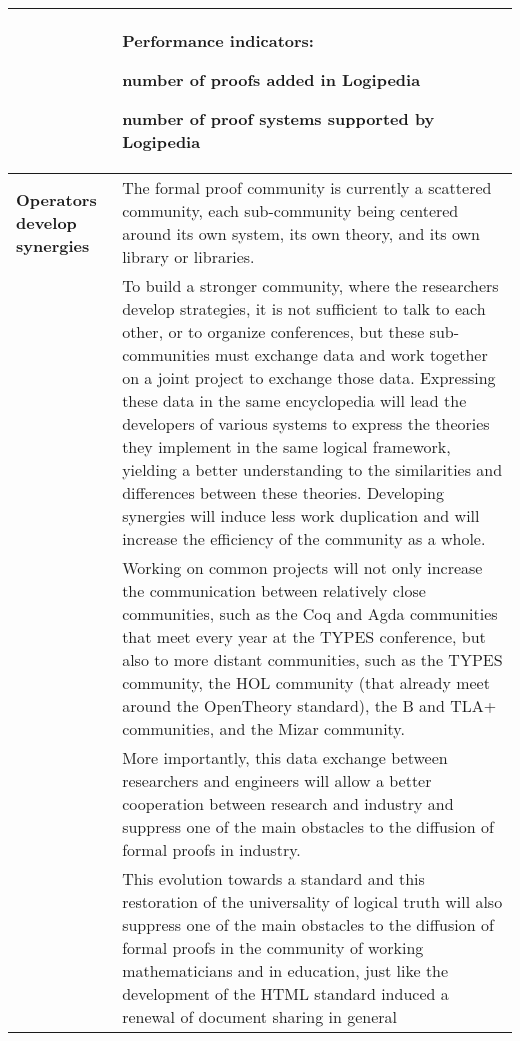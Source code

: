 \begin{longtable}{|p{}|p{}|}
\\
&
\colorbox{color2}{\bf Performance indicators:}
\begin{compactitem}
\item number of proofs added in Logipedia
\item number of proof systems supported by Logipedia
\end{compactitem}
\\
\hline
{\bf Operators develop synergies}
&
The formal proof community is currently a scattered community, each
sub-community being centered around its own system, its own theory,
and its own library or libraries.\\
&
\hspace{0.4cm}
To build a stronger community, where the researchers develop
strategies, it is not sufficient to talk to each other, or to organize
conferences, but these sub-communities must exchange data and work
together on a joint project to exchange those data.  Expressing these
data in the same encyclopedia will lead the developers of various
systems to express the theories they implement in the same logical
framework, yielding a better understanding to the similarities and
differences between these theories.  Developing synergies will induce
less work duplication and will increase the efficiency of the
community as a whole.
\\
&
\hspace{0.4cm}
Working on common projects will not only increase the communication
between relatively close communities, such as the Coq and
  Agda communities that meet every year at the TYPES conference, but
also to more distant communities, such as the TYPES community, the HOL
community (that already meet around the OpenTheory standard),
the B and TLA+ communities, and the Mizar community.\\
&
\hspace{0.4cm}
More importantly, this data exchange between researchers and engineers
will allow a better cooperation between research and industry and
suppress one of the main obstacles to the diffusion of formal proofs
in industry.\\
&
\hspace{0.4cm}
This evolution towards a standard and this restoration of the
universality of logical truth will also suppress one of the main
obstacles to the diffusion of formal proofs in the community of
working mathematicians and in education, just like the development
of the HTML standard induced a renewal of document sharing in general

\end{longtable}
